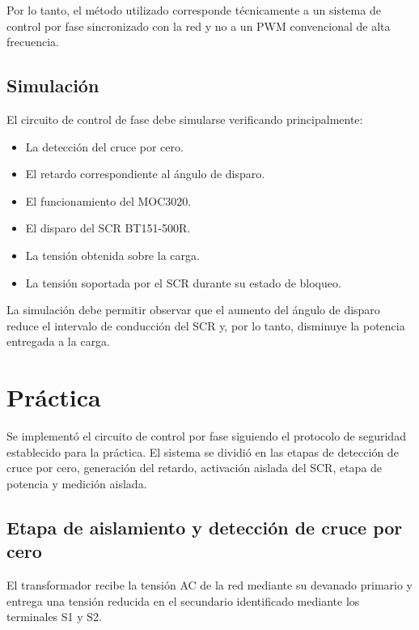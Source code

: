 \documentclass[12pt]{article}
\begin{document}
Por lo tanto, el método utilizado corresponde técnicamente a un sistema de
control por fase sincronizado con la red y no a un PWM convencional de alta
frecuencia.

\subsection{Simulación}

El circuito de control de fase debe simularse verificando principalmente:

\begin{itemize}
    \item La detección del cruce por cero.
    \item El retardo correspondiente al ángulo de disparo.
    \item El funcionamiento del MOC3020.
    \item El disparo del SCR BT151-500R.
    \item La tensión obtenida sobre la carga.
    \item La tensión soportada por el SCR durante su estado de bloqueo.
\end{itemize}

La simulación debe permitir observar que el aumento del ángulo de disparo
reduce el intervalo de conducción del SCR y, por lo tanto, disminuye la
potencia entregada a la carga.


\section{Práctica}

Se implementó el circuito de control por fase siguiendo el protocolo de
seguridad establecido para la práctica. El sistema se dividió en las
etapas de detección de cruce por cero, generación del retardo, activación
aislada del SCR, etapa de potencia y medición aislada.

\subsection{Etapa de aislamiento y detección de cruce por cero}

El transformador recibe la tensión AC de la red mediante su devanado primario
y entrega una tensión reducida en el secundario identificado mediante los
terminales S1 y S2.
\end{document}
